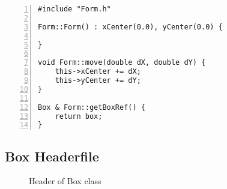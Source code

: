 \documentclass{article}
\begin{document}
\begin{lstlisting}[basicstyle=\footnotesize\ttfamily, numbers=left, stepnumber=1, numberstyle = \normalsize]
#include "Form.h"

Form::Form() : xCenter(0.0), yCenter(0.0) {

}

void Form::move(double dX, double dY) {
	this->xCenter += dX;
	this->yCenter += dY;
}

Box & Form::getBoxRef() {
	return box;
}
\end{lstlisting}

\subsection{Box Headerfile}
\begin{figure}
\scriptsize{\caption{Header of Box class}}
\end{figure}
\end{document}
